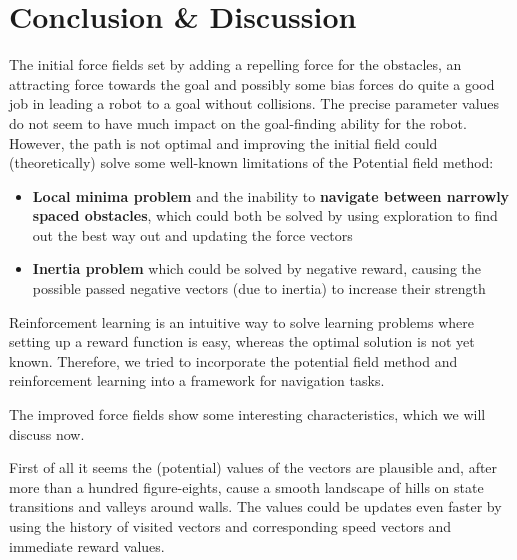 \documentclass[11pt]{article}
\begin{document}





\section{Conclusion \& Discussion}
\label{sec:conclusion}

The initial force fields set by adding a repelling force for the obstacles, an attracting force towards the goal and possibly some bias forces do quite a good job in leading a robot to a goal without collisions. The precise parameter values do not seem to have much impact on the goal-finding ability for the robot. However, the path is not optimal and improving the initial field could (theoretically) solve some well-known limitations\cite{koren91} of the Potential field method:

\begin{itemize}
 \item \textbf{Local minima problem} and the inability to \textbf{navigate between narrowly spaced obstacles}, which could both be solved by using exploration to find out the best way out and updating the force vectors
 \item \textbf{Inertia problem} which could be solved by negative reward, causing the possible passed negative vectors (due to inertia) to increase their strength
\end{itemize}

Reinforcement learning is an intuitive way to solve learning problems where setting up a reward function is easy, whereas the optimal solution is not yet known. Therefore, we tried to incorporate the potential field method and reinforcement learning into a framework for navigation tasks.

The improved force fields show some interesting characteristics, which we will discuss now.

First of all it seems the (potential) values of the vectors are plausible and, after more than a hundred figure-eights, cause a smooth landscape of hills on state transitions and valleys around walls. The values could be updates even faster by using the history of visited vectors and corresponding speed vectors and immediate reward values.
\end{document}

